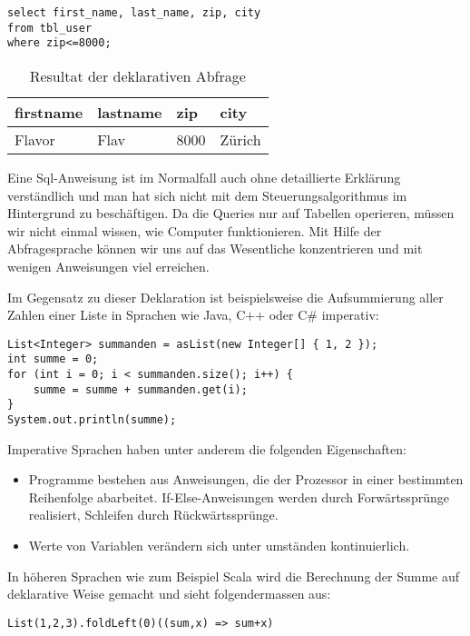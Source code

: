 \begin{lstlisting}[caption=Sql Deklaration]
select first_name, last_name, zip, city 
from tbl_user 
where zip<=8000;
\end{lstlisting}


  \begin{longtable}{|p{2cm}|p{2cm}|p{2cm}|p{2cm}|}
    \caption{Resultat der deklarativen Abfrage}\\
\hline
  firstname & lastname & zip & city\\
  \hline
    Flavor & Flav & 8000 & Z\"urich\\
  \hline
  \end{longtable}

Eine Sql-Anweisung ist im Normalfall auch ohne detaillierte Erkl\"arung verst\"andlich und man hat sich nicht mit dem Steuerungsalgorithmus im Hintergrund zu besch\"aftigen. Da die Queries nur auf Tabellen operieren, m\"ussen wir nicht einmal wissen, wie Computer funktionieren. Mit Hilfe der Abfragesprache k\"onnen wir uns auf das Wesentliche konzentrieren und mit wenigen Anweisungen viel erreichen. \cite{Piepmeyer201006}

Im Gegensatz zu dieser Deklaration ist beispielsweise die Aufsummierung aller Zahlen einer Liste in Sprachen wie Java, C++ oder C\# imperativ:

\begin{lstlisting}[caption=Summe einer Liste in Java]
List<Integer> summanden = asList(new Integer[] { 1, 2 });
int summe = 0;
for (int i = 0; i < summanden.size(); i++) {
	summe = summe + summanden.get(i);
}
System.out.println(summe);
\end{lstlisting}

Imperative Sprachen haben unter anderem die folgenden Eigenschaften:
\begin{itemize}
\item Programme bestehen aus Anweisungen, die der Prozessor in einer bestimmten Reihenfolge abarbeitet. If-Else-Anweisungen werden durch Forw\"artsspr\"unge realisiert, Schleifen durch R\"uckw\"artsspr\"unge.
\item Werte von Variablen ver\"andern sich unter umst\"anden kontinuierlich.
\end{itemize}

In h\"oheren Sprachen wie zum Beispiel Scala wird die Berechnung der Summe auf deklarative Weise gemacht und sieht folgendermassen aus:
\begin{lstlisting}[caption=Summe einer Liste in Scala]
List(1,2,3).foldLeft(0)((sum,x) => sum+x)
\end{lstlisting} 

